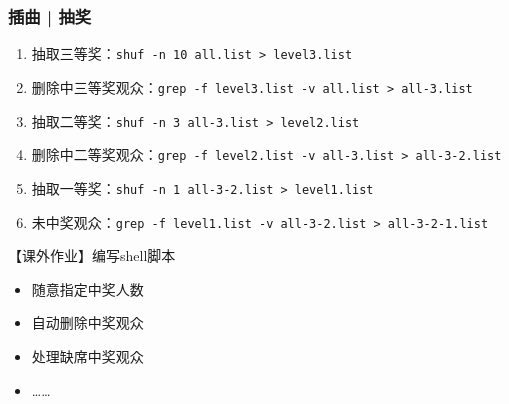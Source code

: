 \begin{frame}[fragile]
  \frametitle{插曲 | 抽奖}
    \begin{enumerate}
      \item 抽取三等奖：\verb=shuf -n 10 all.list > level3.list=
      \item 删除中三等奖观众：\verb=grep -f level3.list -v all.list > all-3.list=
      \item 抽取二等奖：\verb=shuf -n 3 all-3.list > level2.list=
      \item 删除中二等奖观众：\verb=grep -f level2.list -v all-3.list > all-3-2.list=
      \item 抽取一等奖：\verb=shuf -n 1 all-3-2.list > level1.list=
      \item 未中奖观众：\verb=grep -f level1.list -v all-3-2.list > all-3-2-1.list=
    \end{enumerate}
  \pause
  \begin{block}{【课外作业】编写shell脚本}
    \begin{itemize}
      \item 随意指定中奖人数
      \item 自动删除中奖观众
      \item 处理缺席中奖观众
      \item ……
    \end{itemize}
  \end{block}
\end{frame}

